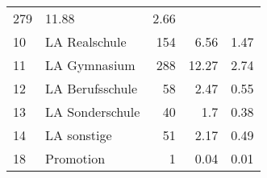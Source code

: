 \begin{longtable}{lXrrr}
       \num{279} &
       \num[round-mode=places,round-precision=2]{11.88} &
         \num[round-mode=places,round-precision=2]{2.66} \\

     10 &
     \multicolumn{1}{X}{ LA Realschule   } &


       \num{154} &
       \num[round-mode=places,round-precision=2]{6.56} &
         \num[round-mode=places,round-precision=2]{1.47} \\

     11 &
     \multicolumn{1}{X}{ LA Gymnasium   } &


       \num{288} &
       \num[round-mode=places,round-precision=2]{12.27} &
         \num[round-mode=places,round-precision=2]{2.74} \\

     12 &
     \multicolumn{1}{X}{ LA Berufsschule   } &


       \num{58} &
       \num[round-mode=places,round-precision=2]{2.47} &
         \num[round-mode=places,round-precision=2]{0.55} \\

     13 &
     \multicolumn{1}{X}{ LA Sonderschule   } &


       \num{40} &
       \num[round-mode=places,round-precision=2]{1.7} &
         \num[round-mode=places,round-precision=2]{0.38} \\

     14 &
     \multicolumn{1}{X}{ LA sonstige   } &


       \num{51} &
       \num[round-mode=places,round-precision=2]{2.17} &
         \num[round-mode=places,round-precision=2]{0.49} \\

     18 &
     \multicolumn{1}{X}{ Promotion   } &


       \num{1} &
       \num[round-mode=places,round-precision=2]{0.04} &
         \num[round-mode=places,round-precision=2]{0.01} \\


\end{longtable}
